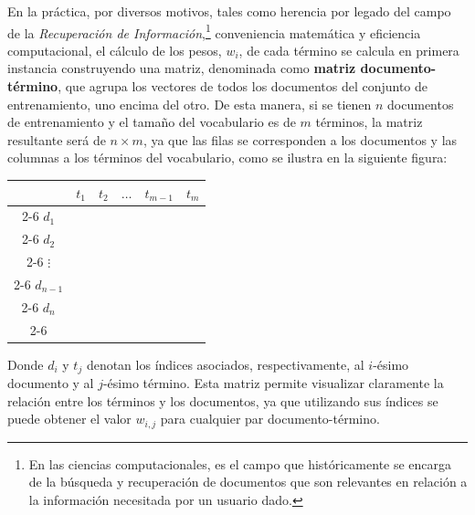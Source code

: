 En la práctica, por diversos motivos, tales como herencia por legado del campo de la \emph{Recuperación de Información},\footnote{En las ciencias computacionales, es el campo que históricamente se encarga de la búsqueda y recuperación de documentos que son relevantes en relación a la información necesitada por un usuario dado.} conveniencia matemática y  eficiencia computacional, el cálculo de los pesos, $w_i$, de cada término se calcula en primera instancia construyendo una matriz, denominada como \textbf{matriz documento-término}, que agrupa los vectores de todos los documentos del conjunto de entrenamiento, uno encima del otro.
De esta manera, si se tienen $n$ documentos de entrenamiento y el tamaño del vocabulario es de $m$ términos, la matriz resultante será de $n\times m$, ya que las filas se corresponden a los documentos y las columnas a los términos del vocabulario, como se ilustra en la siguiente figura:

\begin{center}
\begin{tabular}{c|c|c|c|c|c|}
\multicolumn{1}{c}{} & \multicolumn{1}{c}{$t_1$} & \multicolumn{1}{c}{$t_2$} & \multicolumn{1}{c}{$\dots$} & \multicolumn{1}{c}{$t_{m-1}$} & \multicolumn{1}{c}{$t_m$} \\
\cline{2-6}
$d_1$ & & & & & \\
\cline{2-6}
$d_2$ & & & & & \\
\cline{2-6}
$\vdots$ & & & & & \\
\cline{2-6}
$d_{n-1}$ & & & & & \\
\cline{2-6}
$d_n$ & & & & & \\
\cline{2-6}
\end{tabular}
\end{center}

Donde $d_i$ y $t_j$ denotan los índices asociados, respectivamente, al $i$-ésimo documento y al $j$-ésimo término.
Esta matriz permite visualizar claramente la relación entre los términos y los documentos, ya que utilizando sus índices se puede obtener el valor $w_{i,j}$ para cualquier par documento-término.

